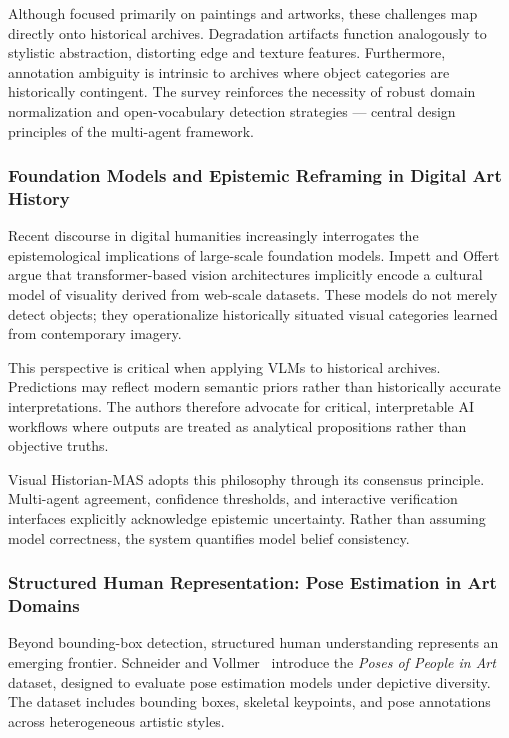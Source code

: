 \documentclass[12pt,onecolumn,a4paper]{IEEEtran}
\begin{document}
Although focused primarily on paintings and artworks, these challenges map directly onto historical archives. Degradation artifacts function analogously to stylistic abstraction, distorting edge and texture features. Furthermore, annotation ambiguity is intrinsic to archives where object categories are historically contingent. The survey reinforces the necessity of robust domain normalization and open-vocabulary detection strategies --- central design principles of the multi-agent framework.

\subsubsection{Foundation Models and Epistemic Reframing in Digital Art History}
Recent discourse in digital humanities increasingly interrogates the epistemological implications of large-scale foundation models. Impett and Offert~\cite{impett_offert_2022_dah} argue that transformer-based vision architectures implicitly encode a cultural model of visuality derived from web-scale datasets. These models do not merely detect objects; they operationalize historically situated visual categories learned from contemporary imagery.

This perspective is critical when applying VLMs to historical archives. Predictions may reflect modern semantic priors rather than historically accurate interpretations. The authors therefore advocate for critical, interpretable AI workflows where outputs are treated as analytical propositions rather than objective truths.

Visual Historian-MAS adopts this philosophy through its consensus principle. Multi-agent agreement, confidence thresholds, and interactive verification interfaces explicitly acknowledge epistemic uncertainty. Rather than assuming model correctness, the system quantifies model belief consistency.

\subsubsection{Structured Human Representation: Pose Estimation in Art Domains}
Beyond bounding-box detection, structured human understanding represents an emerging frontier. Schneider and Vollmer~\cite{schneider_vollmer_2024_popia} introduce the \textit{Poses of People in Art} dataset, designed to evaluate pose estimation models under depictive diversity. The dataset includes bounding boxes, skeletal keypoints, and pose annotations across heterogeneous artistic styles.
\end{document}
